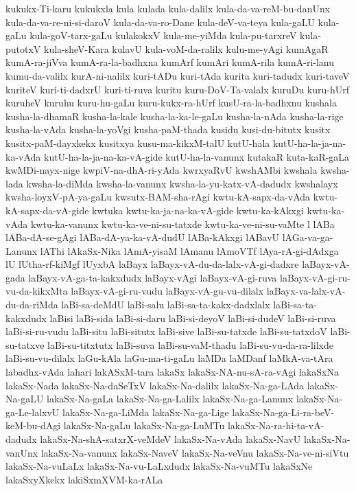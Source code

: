 {kukukx-Ti-karu
kukukxla
kula
kulada
kula-dalilx
kula-da-va-reM-bu-danUnx
kula-da-va-re-ni-si-daroV
kula-da-va-ro-Dane
kula-deV-va-teya
kula-gaLU
kula-gaLu
kula-goV-tarx-gaLu
kulakokxV
kula-me-yiMda
kula-pu-tarxreV
kula-putotxV
kula-sheV-Kara
kulavU
kula-voM-da-ralilx
kulu-me-yAgi
kumAgaR
kumA-ra-jiVva
kumA-ra-la-badhxna
kumArf
kumAri
kumA-rila
kumA-ri-lanu
kumu-da-valilx
kurA-ni-nalilx
kuri-tADu
kuri-tAda
kurita
kuri-tadudx
kuri-taveV
kuriteV
kuri-ti-dadxrU
kuri-ti-ruva
kuritu
kuru-DoV-Ta-valalx
kuruDu
kuru-hUrf
kuruheV
kuruhu
kuru-hu-gaLu
kuru-kukx-ra-hUrf
kusU-ra-la-badhxnu
kushala
kusha-la-dhamaR
kusha-la-kale
kusha-la-ka-le-gaLu
kusha-la-nAda
kusha-la-rige
kusha-la-vAda
kusha-la-yoVgi
kusha-paM-thada
kusidu
kusi-du-bitutx
kusitx
kusitx-paM-dayxkekx
kusitxya
kusu-ma-kikxM-talU
kutU-hala
kutU-ha-la-ja-na-ka-vAda
kutU-ha-la-ja-na-ka-vA-gide
kutU-ha-la-vanunx
kutakaR
kuta-kaR-gaLa
kwMDi-nayx-nige
kwpiV-na-dhA-ri-yAda
kwrxyaRvU
kwshAMbi
kwshala
kwsha-lada
kwsha-la-diMda
kwsha-la-vanunx
kwsha-la-yu-katx-vA-dadudx
kwshalayx
kwsha-loyxV-pA-ya-gaLu
kwsutx-BAM-sha-rAgi
kwtu-kA-sapx-da-vAda
kwtu-kA-sapx-da-vA-gide
kwtuka
kwtu-ka-ja-na-ka-vA-gide
kwtu-ka-kAkxgi
kwtu-ka-vAda
kwtu-ka-vanunx
kwtu-ka-ve-ni-su-tatxde
kwtu-ka-ve-ni-su-vaMte
l
lABa
lABa-dA-se-gAgi
lABa-dA-ya-ka-vA-dudU
lABa-kAkxgi
lABavU
lAGa-va-ga-Lanunx
lAThi
lAkaSx-Nika
lAmA-yisaM
lAmanu
lAmoVTf
lAya-rA-gi-dAdxga
lU
lUtha-rf-kiMgf
lUyxbA
laBayx
laBayx-vA-du-da-lalx-vA-gi-dadxre
laBayx-vA-gada
laBayx-vA-ga-ta-kakxdudx
laBayx-vAgi
laBayx-vA-gi-ruva
laBayx-vA-gi-ru-vu-da-kikxMta
laBayx-vA-gi-ru-vudu
laBayx-vA-gu-vu-dilalx
laBayx-va-lalx-vA-du-da-riMda
laBi-sa-deMdU
laBi-salu
laBi-sa-ta-kakx-dadxlalx
laBi-sa-ta-kakxdudx
laBisi
laBi-sida
laBi-si-daru
laBi-si-deyoV
laBi-si-dudeV
laBi-si-ruva
laBi-si-ru-vudu
laBi-situ
laBi-situtx
laBi-sive
laBi-su-tatxde
laBi-su-tatxdoV
laBi-su-tatxve
laBi-su-titxtutx
laBi-suva
laBi-su-vaM-thadu
laBi-su-vu-da-ra-lilxde
laBi-su-vu-dilalx
laGu-kAla
laGu-ma-ti-gaLu
laMDa
laMDanf
laMkA-va-tAra
labadhx-vAda
lahari
lakASxM-tara
lakaSx
lakaSx-NA-nu-sA-ra-vAgi
lakaSxNa
lakaSx-Nada
lakaSx-Na-daSeTxV
lakaSx-Na-dalilx
lakaSx-Na-ga-LAda
lakaSx-Na-gaLU
lakaSx-Na-gaLa
lakaSx-Na-ga-Lalilx
lakaSx-Na-ga-Lanunx
lakaSx-Na-ga-Le-lalxvU
lakaSx-Na-ga-LiMda
lakaSx-Na-ga-Lige
lakaSx-Na-ga-Li-ra-beV-keM-bu-dAgi
lakaSx-Na-gaLu
lakaSx-Na-ga-LuMTu
lakaSx-Na-ra-hi-ta-vA-dadudx
lakaSx-Na-shA-satxrX-veMdeV
lakaSx-Na-vAda
lakaSx-NavU
lakaSx-Na-vanUnx
lakaSx-Na-vanunx
lakaSx-NaveV
lakaSx-Na-veVnu
lakaSx-Na-ve-ni-siVtu
lakaSx-Na-vuLaLx
lakaSx-Na-vu-LaLxdudx
lakaSx-Na-vuMTu
lakaSxNe
lakaSxyXkekx
lakiSxmXVM-ka-rALa
}
